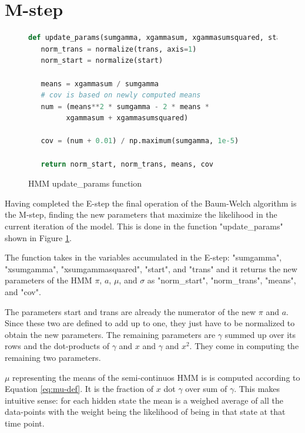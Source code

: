 \section{M-step}

\begin{figure}
\begin{singlespace}
\begin{lstlisting}[language=Python]
def update_params(sumgamma, xgammasum, xgammasumsquared, start, trans):
   norm_trans = normalize(trans, axis=1)
   norm_start = normalize(start)

   means = xgammasum / sumgamma
   # cov is based on newly computed means
   num = (means**2 * sumgamma - 2 * means *
         xgammasum + xgammasumsquared)

   cov = (num + 0.01) / np.maximum(sumgamma, 1e-5)

   return norm_start, norm_trans, means, cov
\end{lstlisting}
\end{singlespace}
\caption{HMM update\_params function}    
\label{fig:hmm-updateparams-listing}
\end{figure}

Having completed the E-step the final operation of the Baum-Welch algorithm is the M-step, finding the new parameters that maximize the likelihood in the current iteration of the model. This is done in the function "update\_params" shown in Figure \ref{fig:hmm-updateparams-listing}.

The function takes in the variables accumulated in the E-step: "sumgamma", \\ "xsumgamma", "xsumgammasquared", "start", and "trans" and it returns the new parameters of the HMM $\pi$, $a$, $\mu$, and $\sigma$ as "norm\_start", "norm\_trans", "means", and "cov". 

The parameters start and trans are already the numerator of the new $\pi$ and $a$. Since these two are defined to add up to one, they just have to be normalized to obtain the new parameters. The remaining parameters are $\gamma$ summed up over its rows and the dot-products of $\gamma$ and $x$ and $\gamma$ and $x^2$. They come in computing the remaining two parameters. 

$\mu$ representing the means of the semi-continuos HMM is is computed according to Equation \eqref{eq:mu-def}. It is the fraction of $x$ dot $\gamma$ over sum of $\gamma$. This makes intuitive sense: for each hidden state the mean is a weighed average of all the data-points with the weight being the likelihood of being in that state at that time point. 

